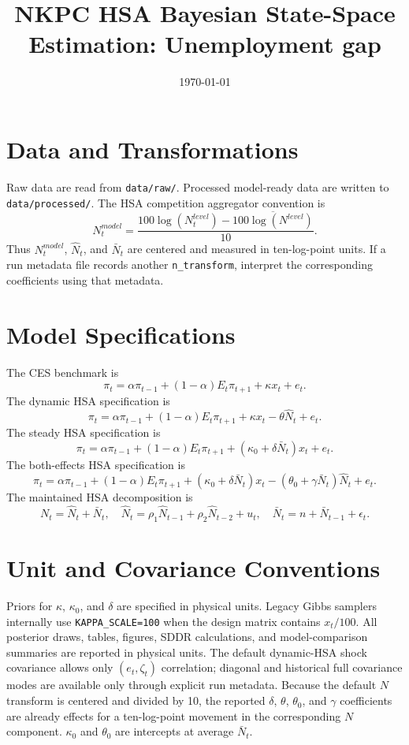 \documentclass[11pt]{article}
\title{NKPC HSA Bayesian State-Space Estimation: Unemployment gap}
\author{}
\date{\today}
\begin{document}
\maketitle

\section{Data and Transformations}
Raw data are read from \texttt{data/raw/}. Processed model-ready data are written to
\texttt{data/processed/}. The HSA competition aggregator convention is
\[
N^{model}_t=\frac{100\log(N^{level}_t)-\overline{100\log(N^{level})}}{10}.
\]
Thus \(N^{model}_t\), \(\hat N_t\), and \(\bar N_t\) are centered and measured
in ten-log-point units. If a run metadata file records another
\texttt{n\_transform}, interpret the corresponding coefficients using that
metadata.

\section{Model Specifications}
The CES benchmark is
\[
\pi_t=\alpha \pi_{t-1}+(1-\alpha)E_t\pi_{t+1}+\kappa x_t+e_t.
\]
The dynamic HSA specification is
\[
\pi_t=\alpha \pi_{t-1}+(1-\alpha)E_t\pi_{t+1}+\kappa x_t-\theta\hat N_t+e_t.
\]
The steady HSA specification is
\[
\pi_t=\alpha \pi_{t-1}+(1-\alpha)E_t\pi_{t+1}+(\kappa_0+\delta\bar N_t)x_t+e_t.
\]
The both-effects HSA specification is
\[
\pi_t=\alpha \pi_{t-1}+(1-\alpha)E_t\pi_{t+1}
+(\kappa_0+\delta\bar N_t)x_t-(\theta_0+\gamma\bar N_t)\hat N_t+e_t.
\]
The maintained HSA decomposition is
\[
N_t=\hat N_t+\bar N_t,\quad
\hat N_t=\rho_1\hat N_{t-1}+\rho_2\hat N_{t-2}+u_t,\quad
\bar N_t=n+\bar N_{t-1}+\epsilon_t.
\]

\section{Unit and Covariance Conventions}
Priors for \(\kappa\), \(\kappa_0\), and \(\delta\) are specified in
physical units. Legacy Gibbs samplers internally use \texttt{KAPPA\_SCALE=100}
when the design matrix contains \(x_t/100\). All posterior draws, tables,
figures, SDDR calculations, and model-comparison summaries are reported in
physical units. The default dynamic-HSA shock covariance allows only
\((e_t,\zeta_t)\) correlation; diagonal and historical full covariance modes
are available only through explicit run metadata.
Because the default \(N\) transform is centered and divided by 10, the reported
\(\delta\), \(\theta\), \(\theta_0\), and \(\gamma\) coefficients are already
effects for a ten-log-point movement in the corresponding \(N\) component.
\(\kappa_0\) and \(\theta_0\) are intercepts at average \(\bar N_t\).
\end{document}
